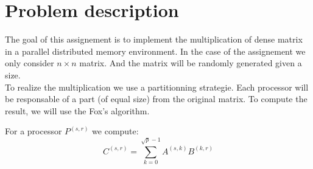 \chapter{Problem description}

The goal of this assignement is to implement the multiplication of dense matrix in a parallel distributed memory environment. In the case of the assignement we only consider $n\times n$ matrix. And the matrix will be randomly generated given a size.\\

To realize the multiplication we use a partitionning strategie. Each processor will be responsable of a part (of equal size) from the original matrix. To compute the result, we will use the Fox's algorithm.

For a processor $P^{(s,r)}$ we compute:
\[C^{(s,r)} = \sum^{\sqrt{p}-1}_{k=0}A^{(s,k)}B^{(k,r)}\]
